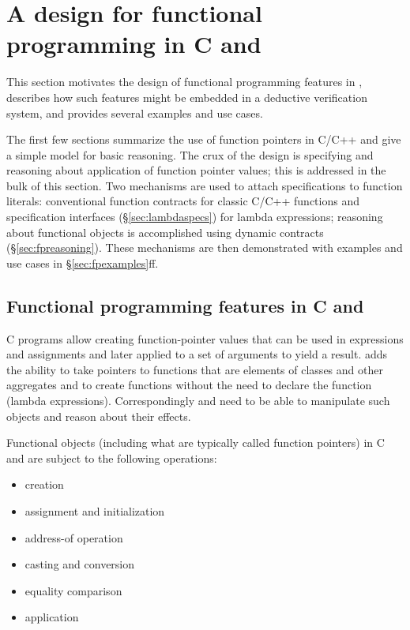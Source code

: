 \section{A design for functional programming in C and \lang}
\label{sec:functionalDiscussion}

This section motivates the design of functional programming features in \NAME, describes how such features might be embedded in a deductive verification system, and provides several examples and use cases.

The first few sections summarize the use of function pointers
in C/C++ and give a simple model for basic reasoning. 
The crux of the design is specifying and reasoning about application of 
function pointer values; this is addressed in the bulk of this
section.
Two mechanisms are used to attach specifications to function literals: conventional function contracts for classic C/C++ functions and 
specification interfaces (\S\ref{sec:lambdaspecs}) for lambda expressions; 
reasoning about functional objects is accomplished using
dynamic contracts (\S\ref{sec:fpreasoning}). 
These mechanisms are then demonstrated with examples and use cases in \S\ref{sec:fpexamples}ff.

 
\subsection{Functional programming features in C and \lang}
\label{sec:fp}

C programs allow creating function-pointer values that 
can be used in expressions and assignments and later applied
to a set of arguments to yield a result. 
\lang adds 
the	ability to take pointers to functions that are elements
of classes and other aggregates and to create functions
without the need to declare the function (lambda expressions). 
Correspondingly \acsl and \NAME need to be able to manipulate such objects and reason about their effects.

Functional objects (including what are typically called function pointers) in C and \lang are subject to the following operations:
\begin{itemize}[noitemsep,nolistsep]
	\item creation
	\item assignment and initialization
	\item address-of operation
	\item casting and conversion
	\item equality comparison
	\item application
\end{itemize}

